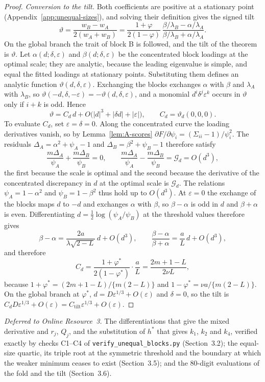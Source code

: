 \begin{proof}
\textit{Conversion to the tilt.} Both coefficients are positive at a stationary point (Appendix~\ref{app:unequal-sizes}), and solving their definition gives the signed tilt
\[
\vartheta=\frac{w_B-w_A}{2(w_A+w_B)}
=\frac{1+\varphi}{2(1-\varphi)}\,
\frac{\beta/\lambda_B-\alpha/\lambda_A}{\beta/\lambda_B+\alpha/\lambda_A} .
\]
On the global branch the trait of block B is followed, and the tilt of the theorem is $\vartheta$. Let $\alpha(d;\delta,\varepsilon)$ and $\beta(d;\delta,\varepsilon)$ be the concentrated block loadings at the optimal scale; they are analytic, because the leading eigenvalue is simple, and equal the fitted loadings at stationary points. Substituting them defines an analytic function $\vartheta(d,\delta,\varepsilon)$. Exchanging the blocks exchanges $\alpha$ with $\beta$ and $\lambda_A$ with $\lambda_B$, so $\vartheta(-d,\delta,-\varepsilon)=-\vartheta(d,\delta,\varepsilon)$, and a monomial $d^i\delta^j\varepsilon^k$ occurs in $\vartheta$ only if $i+k$ is odd. Hence
\[
\vartheta=C_d\,d+O\bigl(|d|^3+|\delta d|+|\varepsilon|\bigr),\qquad C_d=\vartheta_d(0,0,0).
\]
To evaluate $C_d$, set $\varepsilon=\delta=0$. Along the concentrated curve the loading derivatives vanish, so by Lemma~\ref{lem:A-scores} $\partial F/\partial\psi_i=(\Sigma_{ii}-1)/\psi_i^2$. The residuals $\Delta_A=\alpha^2+\psi_A-1$ and $\Delta_B=\beta^2+\psi_B-1$ therefore satisfy
\[
\frac{m\Delta_A}{\psi_A}+\frac{m\Delta_B}{\psi_B}=0,\qquad
\frac{m\Delta_A}{\psi_A}-\frac{m\Delta_B}{\psi_B}=\mathcal G_d=O(d^3),
\]
the first because the scale is optimal and the second because the derivative of the concentrated discrepancy in $d$ at the optimal scale is $\mathcal G_d$. The relations $\psi_A=1-\alpha^2$ and $\psi_B=1-\beta^2$ thus hold up to $O(d^3)$. At $\varepsilon=0$ the exchange of the blocks maps $d$ to $-d$ and exchanges $\alpha$ with $\beta$, so $\beta-\alpha$ is odd in $d$ and $\beta+\alpha$ is even. Differentiating $d=\tfrac12\log(\psi_A/\psi_B)$ at the threshold values therefore gives
\[
\beta-\alpha=\frac{2a}{\lambda\sqrt{2-L}}\,d+O(d^3),\qquad
\frac{\beta-\alpha}{\beta+\alpha}=\frac aL\,d+O(d^3),
\]
and therefore
\[
C_d=\frac{1+\varphi^*}{2(1-\varphi^*)}\cdot\frac aL=\frac{2m+1-L}{2\nu L},
\]
because $1+\varphi^*=(2m+1-L)/\{m(2-L)\}$ and $1-\varphi^*=\nu a/\{m(2-L)\}$. On the global branch at $\varphi^*$, $d=D\varepsilon^{1/3}+O(\varepsilon)$ and $\delta=0$, so the tilt is $C_dD\varepsilon^{1/3}+O(\varepsilon)=C_{\mathrm{tilt}}\varepsilon^{1/3}+O(\varepsilon)$.
\end{proof}

\textit{Deferred to Online Resource~3.} The differentiations that give the mixed derivative and $r_j$, $Q_j$, and the substitution of $h^*$ that gives $k_1$, $k_2$ and $k_4$, verified exactly by checks C1--C4 of \texttt{verify\_unequal\_blocks.py} (Section~3.2); the equal-size quartic, its triple root at the symmetric threshold and the boundary at which the weaker minimum ceases to exist (Section~3.5); and the 80-digit evaluations of the fold and the tilt (Section~3.6).

